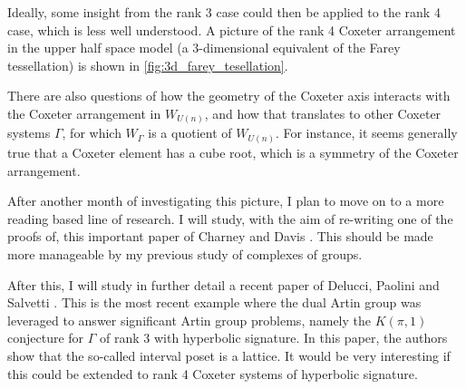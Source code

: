 Ideally, some insight from the rank 3 case could then be applied to the rank 4 case, which is less well understood.
A picture of the rank 4 Coxeter arrangement in the upper half space model (a 3-dimensional equivalent of the Farey tessellation) is shown in \cref{fig:3d_farey_tesellation}.

There are also questions of how the geometry of the Coxeter axis interacts with the Coxeter arrangement in $W_{U(n)}$, and how that translates to other Coxeter systems  $\Gamma$, for which  $W_\Gamma$ is a quotient of  $W_{U(n)}$.
For instance, it seems generally true that a Coxeter element has a cube root, which is a symmetry of the Coxeter arrangement.

After another month of investigating this picture, I plan to move on to a more reading based line of research.
I will study, with the aim of re-writing one of the proofs of, this important paper of Charney and Davis \cite{charney_davis_kpi_1995}.
This should be made more manageable by my previous study of complexes of groups.

After this, I will study in further detail a recent paper of Delucci, Paolini and Salvetti \cite{delucchi_etal_dual_2024}.
This is the most recent example where the dual Artin group was leveraged to answer significant Artin group problems, namely the $K(\pi,1)$ conjecture for $\Gamma$ of rank 3 with hyperbolic signature.
In this paper, the authors show that the so-called interval poset is a lattice.
It would be very interesting if this could be extended to rank 4 Coxeter systems of hyperbolic signature.
